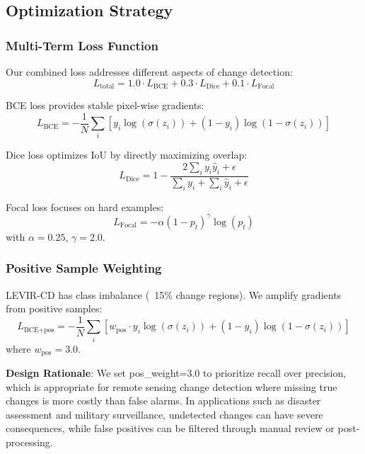 \documentclass[journal]{IEEEtran}
\begin{document}
\subsection{Optimization Strategy}

\subsubsection{Multi-Term Loss Function}

Our combined loss addresses different aspects of change detection:
\begin{equation}
L_{\text{total}} = 1.0 \cdot L_{\text{BCE}} + 0.3 \cdot L_{\text{Dice}} + 0.1 \cdot L_{\text{Focal}}
\end{equation}

BCE loss provides stable pixel-wise gradients:
\begin{equation}
L_{\text{BCE}} = -\frac{1}{N} \sum_i [y_i \log(\sigma(z_i)) + (1-y_i) \log(1-\sigma(z_i))]
\end{equation}

Dice loss optimizes IoU by directly maximizing overlap:
\begin{equation}
L_{\text{Dice}} = 1 - \frac{2 \sum_i y_i \hat{y}_i + \epsilon}{\sum_i y_i + \sum_i \hat{y}_i + \epsilon}
\end{equation}

Focal loss focuses on hard examples:
\begin{equation}
L_{\text{Focal}} = -\alpha (1-p_t)^\gamma \log(p_t)
\end{equation}
with $\alpha=0.25$, $\gamma=2.0$.

\subsubsection{Positive Sample Weighting}

LEVIR-CD has class imbalance (~15\% change regions). We amplify gradients from positive samples:
\begin{equation}
L_{\text{BCE+pos}} = -\frac{1}{N} \sum_i [w_{\text{pos}} \cdot y_i \log(\sigma(z_i)) + (1-y_i) \log(1-\sigma(z_i))]
\end{equation}
where $w_{\text{pos}}=3.0$.

\textbf{Design Rationale}: We set pos\_weight=3.0 to prioritize recall over precision, which is appropriate for remote sensing change detection where missing true changes is more costly than false alarms. In applications such as disaster assessment and military surveillance, undetected changes can have severe consequences, while false positives can be filtered through manual review or post-processing.
\end{document}

